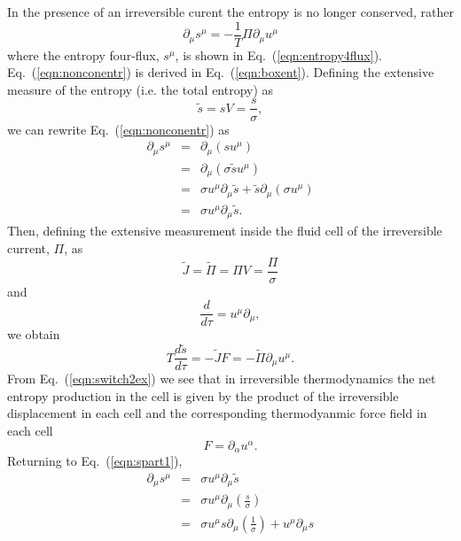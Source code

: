 \documentclass[aps,article]{revtex4}
\begin{document}
In the presence of an irreversible curent the entropy is no longer conserved, rather
\begin{equation}\label{eqn:nonconentr}
\partial_{\mu}s^{\mu}=-\frac{1}{T}\Pi\partial_{\mu}u^{\mu}
\end{equation}
where the entropy four-flux, $s^{\mu}$, is shown in Eq.\ (\ref{eqn:entropy4flux}). Eq.\ (\ref{eqn:nonconentr}) is derived in Eq.\ (\ref{eqn:boxent}). 
Defining the extensive measure of the entropy (i.e. the total entropy) as
\begin{equation}
\tilde{s}=sV=\frac{s}{\sigma},
\end{equation}
we can rewrite Eq.\ (\ref{eqn:nonconentr}) as
\begin{eqnarray}\label{eqn:spart1}
\partial_{\mu}s^{\mu}&=&\partial_{\mu}\left(su^{\mu}\right)\nonumber\\
&=&\partial_{\mu}\left(\sigma\tilde{s}u^{\mu}\right)\nonumber\\
&=&\sigma u^{\mu}\partial_{\mu}\tilde{s}+\tilde{s}\partial_{\mu}\left(\sigma u^{\mu}\right)\nonumber\\
&=&\sigma u^{\mu}\partial_{\mu}\tilde{s}.
\end{eqnarray}
Then, defining the extensive measurement inside the fluid cell of the irreversible current, $\Pi$, as 
\begin{equation}\label{eqn:pitilde}
\tilde{J}=\tilde{\Pi}=\Pi V=\frac{\Pi}{\sigma}
\end{equation}
and
\begin{equation}
\frac{d}{d\tau}=u^{\mu}\partial_{\mu},
\end{equation}
we obtain
\begin{equation}\label{eqn:switch2ex}
T\frac{d\tilde{s}}{d\tau}=-\tilde{J}F=-\tilde{\Pi}\partial_{\mu}u^{\mu}.
\end{equation}
From Eq.\ (\ref{eqn:switch2ex}) we see that in irreversible thermodynamics the net entropy production in the cell is given by the product of the irreversible displacement in each cell and the corresponding thermodyanmic force field in each cell
\begin{equation}\label{eqn:force}
F=\partial_{\alpha}u^{\alpha}.
\end{equation}
Returning to Eq.\ (\ref{eqn:spart1}),
\begin{eqnarray}\label{eqn:spart2}
\partial_{\mu}s^{\mu}&=&\sigma u^{\mu}\partial_{\mu}\tilde{s}\nonumber\\
&=&\sigma u^{\mu}\partial_{\mu}\left(\frac{s}{\sigma}\right)\nonumber\\
&=&\sigma u^{\mu}s\partial_{\mu}\left(\frac{1}{\sigma}\right)+u^{\mu}\partial_{\mu}s\nonumber\\
\end{eqnarray}
\end{document}
